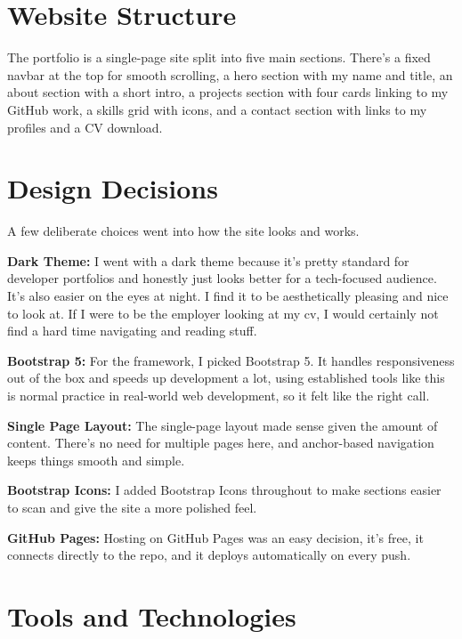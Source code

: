 \documentclass[12pt, a4paper]{article}
\begin{document}
\section{Website Structure}

The portfolio is a single-page site split into five main sections. There's a fixed navbar at the top for smooth scrolling, a hero section with my name and title, an about section with a short intro, a projects section with four cards linking to my GitHub work, a skills grid with icons, and a contact section with links to my profiles and a CV download.

\section{Design Decisions}

A few deliberate choices went into how the site looks and works.

\textbf{Dark Theme:} I went with a dark theme because it's pretty standard for developer portfolios and honestly just looks better for a tech-focused audience. It's also easier on the eyes at night. I find it to be aesthetically pleasing and nice to look at. If I were to be the employer looking at my cv, I would certainly not find a hard time navigating and reading stuff. 

\textbf{Bootstrap 5:} For the framework, I picked Bootstrap 5. It handles responsiveness out of the box and speeds up development a lot, using established tools like this is normal practice in real-world web development, so it felt like the right call.

\textbf{Single Page Layout:} The single-page layout made sense given the amount of content. There's no need for multiple pages here, and anchor-based navigation keeps things smooth and simple.

\textbf{Bootstrap Icons:} I added Bootstrap Icons throughout to make sections easier to scan and give the site a more polished feel.

\textbf{GitHub Pages:} Hosting on GitHub Pages was an easy decision, it's free, it connects directly to the repo, and it deploys automatically on every push.

\section{Tools and Technologies}
\end{document}
